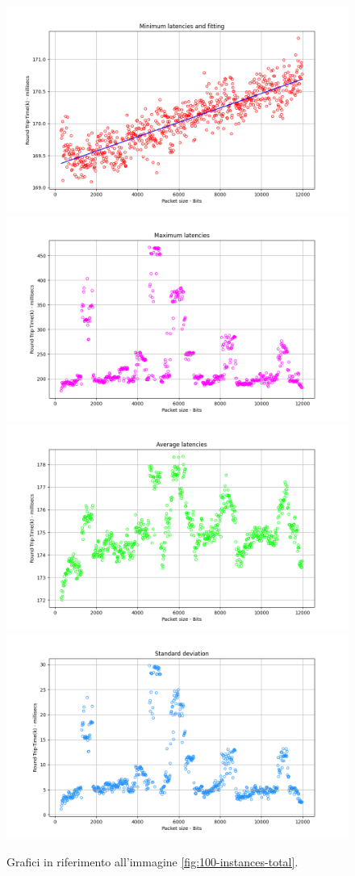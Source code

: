 \begin{figure}[h]
    \centering
    \includegraphics[width = .49\textwidth]{hw-2/report/imgs/100-instances/la-min-latencies.png}
    \includegraphics[width = .49\textwidth]{hw-2/report/imgs/100-instances/la-max-latencies.png}
    \includegraphics[width = .49\textwidth]{hw-2/report/imgs/100-instances/la-avg-latencies.png}
    \includegraphics[width = .49\textwidth]{hw-2/report/imgs/100-instances/la-standard-deviation.png}
    \caption{Grafici in riferimento all'immagine \ref{fig:100-instances-total}.}
    \label{fig:100-instances-stats}
\end{figure}

